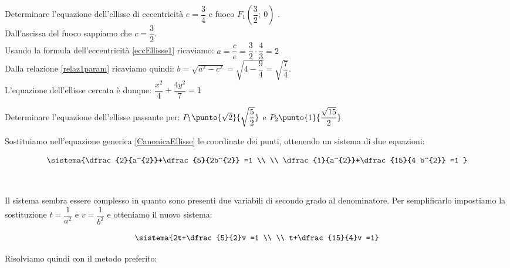\begin{esempio}
Determinare l'equazione dell'ellisse di eccentricità \(e=\dfrac{3}{4} \) e fuoco \( F_{1} \left( \dfrac{3}{2} ;~0\right)\) .
\\[1pt]
Dall'ascissa del fuoco sappiamo che \(c= \dfrac{3}{2} \).\\[3pt]
Usando la formula dell'eccentricità \eqref{eccEllisse1} ricaviamo:
\(a=\dfrac{c}{e}=\dfrac{3}{2}\cdot\dfrac{4}{3}=2\)\\[3pt]
Dalla relazione \eqref{relaz1param} ricaviamo quindi: 
\(b=\sqrt{a^{2}-c^{2}}=\sqrt{4-\dfrac{9}{4}}=\sqrt{\dfrac{7}{4}}\).\\[3pt]
L'equazione dell'ellisse cercata è dunque: \( 
\dfrac{x^{2}}{4}+\dfrac{4y^{2}}{7} =1\)
\end{esempio}

\begin{esempio} 
 
Determinare l'equazione dell'ellisse 
passante per: \(P_{1} \punto{\sqrt{2}}{\sqrt{\dfrac{5}{2}}}\) e \(P_{2} \punto{1}{\dfrac{\sqrt{15}}{2}}\)\\[2pt]
  \begin{minipage}{.7\textwidth}
   Sostituiamo nell'equazione generica \eqref{CanonicaEllisse} le coordinate dei 
punti, ottenendo un sistema di due equazioni:
  \end{minipage}
  \begin{minipage}{.3\textwidth}
\[\sistema{\dfrac{2}{a^{2}}+\dfrac{5}{2b^{2}} =1   \\ \\ 
\dfrac{1}{a^{2}}+\dfrac{15}{4 b^{2}} =1 }\]
  \end{minipage}\\[10pt]
  \begin{minipage}{.7\textwidth}
Il sistema sembra essere complesso in quanto sono 
presenti due variabili di secondo grado al denominatore. Per semplificarlo 
impostiamo la sostituzione 
\(t= \dfrac{1}{a^{2}} \) e \(v= \dfrac{1}{b^{2}} \) 
e otteniamo il nuovo sistema:
  \end{minipage}
  \begin{minipage}{.3\textwidth}
\[\sistema{2t+\dfrac{5}{2}v =1 \\ \\ t+\dfrac{15}{4}v =1}\]
  \end{minipage}
  
\vspace{10pt}

\noindent Risolviamo quindi con il metodo preferito:


\end{esempio}
